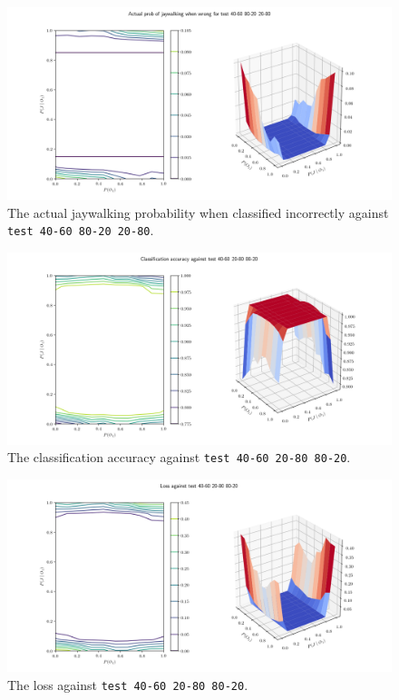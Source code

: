 \documentclass[]{report}
\newcommand{\code}{\texttt}
\begin{document}
\begin{figure}[h]
    \centering
    \centerline{\includegraphics[scale=0.55]{test_40-60_80-20_20-80_jay_prob.png}}
    \caption[]{The actual jaywalking probability when classified incorrectly against \code{test 40-60 80-20 20-80}.}
    \label{fig:test_40-60_80-20_20-80_jay_prob_plot}
\end{figure}

% 
% 

\begin{figure}[h]
    \centering
    \centerline{\includegraphics[scale=0.55]{test_40-60_20-80_80-20_accuracy.png}}
    \caption[]{The classification accuracy against \code{test 40-60 20-80 80-20}.}
    \label{fig:test_40-60_20-80_80-20_accuracy_plot}
\end{figure}

\begin{figure}[h]
    \centering
    \centerline{\includegraphics[scale=0.55]{test_40-60_20-80_80-20_loss.png}}
    \caption[]{The loss against \code{test 40-60 20-80 80-20}.}
    \label{fig:test_40-60_20-80_80-20_loss_plot}
\end{figure}
\end{document}
